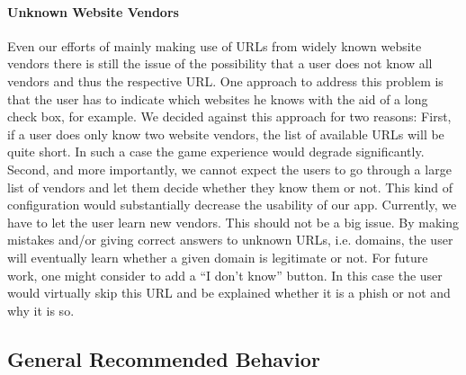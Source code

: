 \paragraph{Unknown Website Vendors}
Even our efforts of mainly making use of URLs from widely known website vendors there is still the issue of the  possibility that a user does not know all vendors and thus the respective URL. 
One approach to address this problem is that the user has to indicate which websites he knows with the aid of a long check box, for example. 
We decided against this approach for two reasons: 
First, if a user does only know two website vendors, the list of available URLs will be quite short. 
In such a case the game experience would degrade significantly. 
Second, and more importantly, we cannot expect the users to go through a large list of vendors and let them decide whether they know them or not. 
This kind of configuration would substantially decrease the usability of our app. 
Currently, we have to let the user learn new vendors. 
This should not be a big issue. 
By making mistakes and/or giving correct answers to unknown URLs, i.e. domains, the user will eventually learn whether a given domain is legitimate or not. 
For future work, one might consider to add a ``I don't know'' button. 
In this case the user would virtually skip this URL and be explained whether it is a phish or not and why it is so.



\subsection{General Recommended Behavior}

